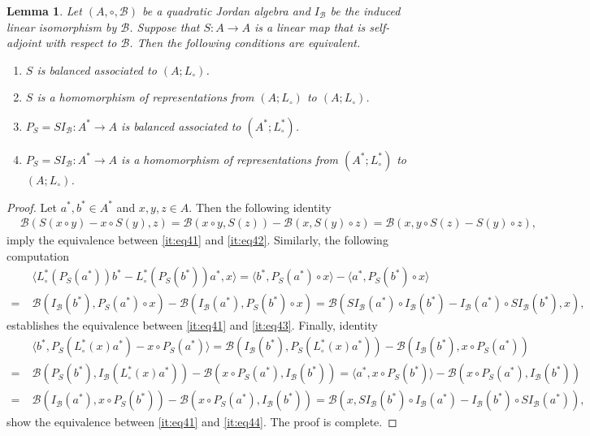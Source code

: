 \documentclass[12pt, reqno, a4paper]{amsart}
\newtheorem{lemma}[theorem]{Lemma}
\theoremstyle{definition}
\begin{document}
\begin{lemma}\label{lem:eq4q}
	Let $(A, \circ, \mathcal{B})$ be a quadratic Jordan algebra and $I_\mathcal{B}$ be the induced linear isomorphism by $\mathcal{B}$.
	Suppose that $S: A \to A$ is a linear map that is self-adjoint with respect to $\mathcal{B}$.
	Then the following conditions are equivalent.
 \begin{enumerate}[label=(\roman*)]
		\item\label{it:eq41}
		      $S$ is balanced associated to $(A; L_{\circ})$.

		\item\label{it:eq42}
		      $S$ is a homomorphism of representations from $(A; L_{\circ})$ to $(A; L_{\circ})$.

		\item\label{it:eq43}
		      $P_S = S I_\mathcal{B}: A^* \to A$ is balanced associated to $(A^*; L_{\circ}^*)$.

		\item\label{it:eq44}
		      $P_S = S I_\mathcal{B}: A^* \to A$ is a homomorphism of representations from $(A^*; L_{\circ}^*)$ to $(A; L_{\circ})$.
	\end{enumerate}
\end{lemma}
\begin{proof}
	Let $a^*, b^* \in A^*$ and $x, y, z \in A$.
	Then the following identity
	\begin{align*}
		 & \mathcal{B}(S(x \circ y) - x \circ S(y), z) = \mathcal{B}(x \circ y, S(z)) - \mathcal{B}(x, S(y) \circ z) =  \mathcal{B}(x, y \circ S(z) - S(y) \circ z),
	\end{align*}
	imply the equivalence between \ref{it:eq41} and \ref{it:eq42}.
	Similarly, the following computation
	\begin{align*}
		& \langle L_{\circ}^*(P_S(a^*))b^* - L_{\circ}^*(P_S(b^*))a^*, x\rangle = \langle b^*, P_S(a^*) \circ x  \rangle - \langle a^*, P_S(b^*) \circ x \rangle \\
		=\;  & \mathcal{B}(I_\mathcal{B}(b^*), P_S(a^*) \circ x) - \mathcal{B}(I_\mathcal{B}(a^*), P_S(b^*) \circ x) = \mathcal{B}(SI_\mathcal{B}(a^*) \circ I_\mathcal{B}(b^*) - I_\mathcal{B}(a^*) \circ SI_\mathcal{B}(b^*), x) ,
	\end{align*}
	establishes the equivalence between \ref{it:eq41} and \ref{it:eq43}.
	Finally, identity
	\begin{align*}
		& \langle b^*, P_S(L_{\circ}^*(x)a^*) - x \circ P_S(a^*)\rangle = \mathcal{B}( I_\mathcal{B}(b^*), P_S(L_{\circ}^*(x)a^*)) - \mathcal{B}(I_\mathcal{B}(b^*), x \circ P_S(a^*)) \\
		=\; & \mathcal{B}(P_S(b^*), I_\mathcal{B}(L_{\circ}^*(x)a^*)) - \mathcal{B}(x \circ P_S(a^*), I_\mathcal{B}(b^*) ) = \langle a^*, x \circ P_S(b^*) \rangle - \mathcal{B}(x \circ P_S(a^*), I_\mathcal{B}(b^*) ) \\
		=\; & \mathcal{B}(I_\mathcal{B}(a^*), x \circ P_S(b^*)) - \mathcal{B}(x \circ P_S(a^*), I_\mathcal{B}(b^*) ) = \mathcal{B}(x, SI_\mathcal{B}(b^*) \circ I_\mathcal{B}(a^*)  - I_\mathcal{B}(b^*) \circ SI_\mathcal{B}(a^*) ),
	\end{align*}
	show the equivalence between \ref{it:eq41} and \ref{it:eq44}.
	The proof is complete.
\end{proof}
\end{document}
